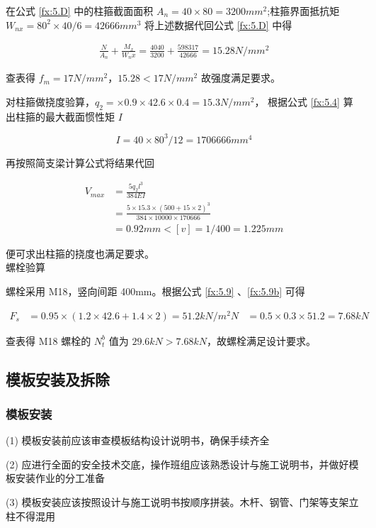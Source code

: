 在公式 \ref{fx:5.D} 中的柱箍截面面积 $A_n=40\times 80=3200 mm^2$;柱箍界面抵抗矩 $W_{nx}=80^2\times 40/6=42666 mm^3$
将上述数据代回公式 \ref{fx:5.D} 中得

\begin{align*}
    \frac{N}{A_n}+\frac{M_x}{W_nx}=\frac{4040}{3200}+\frac{598317}{42666}=15.28 N/mm^2
\end{align*}

查表得 $f_m=17N/mm^2$，$15.28<17N/mm^2$ 故强度满足要求。

对柱箍做挠度验算，$q_2=\times 0.9\times 42.6\times 0.4=15.3 N/mm^2$，
根据公式 \ref{fx:5.4} 算出柱箍的最大截面惯性矩 $I$

\[
    I=40\times 80^3 /12=1706666 mm^4
\]

再按照简支梁计算公式将结果代回

\begin{align*}
    V_{max}&=\frac{5q_2l^3}{384EI}\\
    &=\frac{5\times 15.3\times (500+15\times 2)^3}{384\times 10000\times 170666}\\
    &=0.92mm<[v]=1/400=1.225mm
\end{align*}

便可求出柱箍的挠度也满足要求。\\

 螺栓验算

螺栓采用 M18，竖向间距 400mm。根据公式 \ref{fx:5.9} 、\ref{fx:5.9b} 可得

\begin{align*}
    F_s&=0.95\times(1.2\times 42.6+1.4\times 2)=51.2 kN/m^2
    N&=0.5\times 0.3\times 51.2=7.68 kN
\end{align*}

查表得 M18 螺栓的 $N^b_t$ 值为 $29.6 kN>7.68 kN$，故螺栓满足设计要求。

\subsection{模板安装及拆除}
\subsubsection{模板安装}

(1) 模板安装前应该审查模板结构设计说明书，确保手续齐全

(2) 应进行全面的安全技术交底，操作班组应该熟悉设计与施工说明书，并做好模板安装作业的分工准备

(3) 模板安装应该按照设计与施工说明书按顺序拼装。木杆、钢管、门架等支架立柱不得混用

